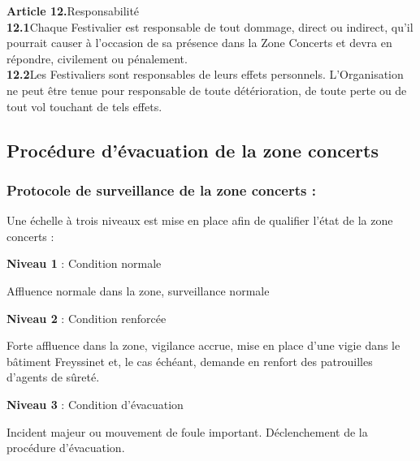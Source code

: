 \documentclass[hidelinks, paper=a4, fontsize=13pt]{report}
\begin{document}
\textbf{Article 12.}\hspace{3mm}Responsabilité\\
\textbf{12.1}\hspace{3mm}Chaque Festivalier est responsable de tout dommage, direct ou indirect, qu’il pourrait causer à l’occasion de sa présence dans la Zone Concerts et devra en répondre, civilement ou pénalement.\\
\textbf{12.2}\hspace{3mm}Les Festivaliers sont responsables de leurs effets personnels. L’Organisation ne peut être tenue pour responsable de toute détérioration, de toute perte ou de tout vol touchant de tels effets. 

\newpage


\subsection{Procédure d’évacuation de la zone concerts}

\subsubsection{Protocole de surveillance de la zone concerts :}

Une échelle à trois niveaux est mise en place afin de qualifier l’état de la zone concerts :
\begin{list}{•}{}
	\item \textbf{Niveau 1} : Condition normale
\end{list}

Affluence normale dans la zone, surveillance normale
\begin{list}{•}{}
	\item \textbf{Niveau 2} : Condition renforcée
\end{list}

Forte affluence dans la zone, vigilance accrue, mise en place d’une vigie dans le bâtiment Freyssinet et, le cas échéant, demande en renfort des patrouilles d’agents de sûreté.

\begin{list}{•}{}
	\item \textbf{Niveau 3} : Condition d’évacuation
\end{list}

Incident majeur ou mouvement de foule important. Déclenchement de la procédure d’évacuation.
\end{document}
